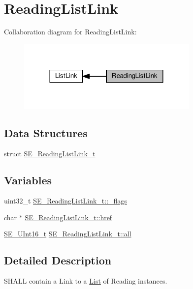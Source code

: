\hypertarget{group__ReadingListLink}{}\section{Reading\+List\+Link}
\label{group__ReadingListLink}
Collaboration diagram for Reading\+List\+Link\+:\nopagebreak
\begin{figure}[H]
\begin{center}
\leavevmode
\includegraphics[width=252pt]{group__ReadingListLink}
\end{center}
\end{figure}
\subsection*{Data Structures}
\begin{DoxyCompactItemize}
\item 
struct \hyperlink{structSE__ReadingListLink__t}{S\+E\+\_\+\+Reading\+List\+Link\+\_\+t}
\end{DoxyCompactItemize}
\subsection*{Variables}
\begin{DoxyCompactItemize}
\item 
uint32\+\_\+t \hyperlink{group__ReadingListLink_ga3bcdb8ba57667805de6274f90241d39d}{S\+E\+\_\+\+Reading\+List\+Link\+\_\+t\+::\+\_\+flags}
\item 
char $\ast$ \hyperlink{group__ReadingListLink_gaa80ddfa1789e318808c6e6ec18dea4b3}{S\+E\+\_\+\+Reading\+List\+Link\+\_\+t\+::href}
\item 
\hyperlink{group__UInt16_gac68d541f189538bfd30cfaa712d20d29}{S\+E\+\_\+\+U\+Int16\+\_\+t} \hyperlink{group__ReadingListLink_ga7ae6dcda4fc482302e9eef04cc34b2de}{S\+E\+\_\+\+Reading\+List\+Link\+\_\+t\+::all}
\end{DoxyCompactItemize}


\subsection{Detailed Description}
S\+H\+A\+LL contain a Link to a \hyperlink{structList}{List} of Reading instances. 

